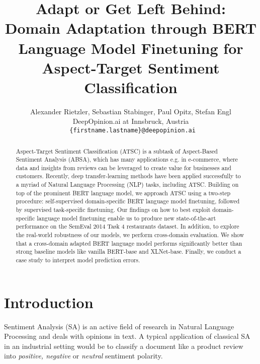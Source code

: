 \documentclass[11pt,a4paper]{article}
\title{Adapt or Get Left Behind:\\
Domain Adaptation through BERT Language Model Finetuning for Aspect-Target Sentiment Classification}
\author{Alexander Rietzler, Sebastian Stabinger, Paul Opitz, Stefan Engl \\
  DeepOpinion.ai at Innsbruck, Austria \\
  \texttt{ \{firstname.lastname\}@deepopinion.ai}
}
\date{}
\newcommand{\rood}[1]{}
\begin{document}
\maketitle
\begin{abstract}  
  \rood{Motivation where in Real Life your contribution is relevant. Inspiration on method. 2 Sentences}
  Aspect-Target Sentiment Classification (ATSC) is a subtask of Aspect-Based Sentiment Analysis (ABSA), which has many applications e.g. in e-commerce, where data and insights from reviews can be leveraged to create value for businesses and customers.
  Recently, deep transfer-learning methods have been applied successfully to a myriad of Natural Language Processing (NLP) tasks, including ATSC.
  Building on top of the prominent BERT language model, we approach ATSC using a two-step procedure: self-supervised domain-specific BERT language model finetuning, followed by supervised task-specific finetuning.
  Our findings on how to best exploit domain-specific language model finetuning enable us to produce new state-of-the-art performance on the SemEval 2014 Task 4 restaurants dataset.
In addition, to explore the real-world robustness of our models, we perform cross-domain evaluation.
We show that a cross-domain adapted BERT language model performs significantly better than strong baseline models like vanilla BERT-base and XLNet-base. Finally, we conduct a case study to interpret model prediction errors.
\end{abstract}

\section{Introduction}


\rood{
  Outcome: The Reader should have.... \\ \\
  The introduction can be framed 
  as such:
  the main contribution is 
  to find out the influences of cross domain finetuning, pre-training
  on both end-task performance and qualitativley on error analysis.
  And also how exactly the number of examples in lm-finetuning seen influence the end-task performance.
  \\
  Structure:
  1. Motivation: The absa task is a important task for application x/y \\
  2. Example:  \\
}

Sentiment Analysis (SA) is an active field of research in Natural Language Processing and deals with opinions in text. A typical application of classical SA in an industrial setting would be to classify a document like a product review into \textit{positive, negative} or \textit{neutral} sentiment polarity.
\end{document}
